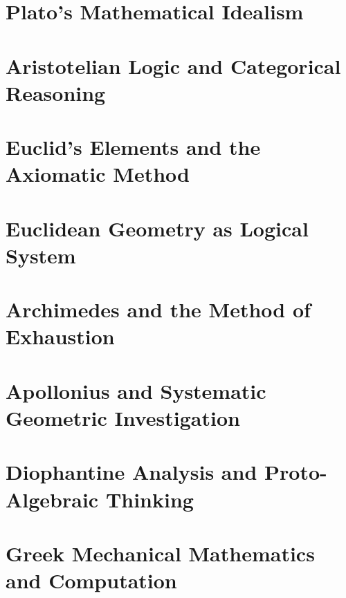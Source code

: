 \chapter{ Plato's Mathematical Idealism  }
\chapter{ Aristotelian Logic and Categorical Reasoning  }
\chapter{ Euclid's Elements and the Axiomatic Method  }
\chapter{ Euclidean Geometry as Logical System  }
\chapter{ Archimedes and the Method of Exhaustion  }
\chapter{ Apollonius and Systematic Geometric Investigation  }
\chapter{ Diophantine Analysis and Proto-Algebraic Thinking  }
\chapter { Greek Mechanical Mathematics and Computation}

